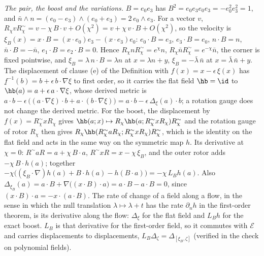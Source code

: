 \emph{The pair, the boost and the variations.} $B = e_{0}e_{3}$ has $B^{2} = e_{0}e_{3}e_{0}e_{3} = -e_{0}^{2}e_{3}^{2} = 1$, and $\bar n \wedge n = (e_{0} - e_{3}) \wedge (e_{0} + e_{3}) = 2\,e_{0} \wedge e_{3}$. For a vector $v$, $R_{\chi}vR_{\chi}^{\sim} = v - \chi\,B \cdot v + O(\chi^{2}) = v + \chi\,v \cdot B + O(\chi^{2})$, so the velocity is $\xi_{B}(x) = x \cdot B = (x \cdot e_{0})e_{3} - (x \cdot e_{3})e_{0}$: $e_{0} \cdot B = e_{3}$, $e_{3} \cdot B = e_{0}$, $n \cdot B = n$, $\bar n \cdot B = -\bar n$, $e_{1} \cdot B = e_{2} \cdot B = 0$. Hence $R_{\chi}nR_{\chi}^{\sim} = e^{\chi}n$, $R_{\chi}\bar nR_{\chi}^{\sim} = e^{-\chi}\bar n$, the corner is fixed pointwise, and $\xi_{B} = \lambda\,n \cdot B = \lambda n$ at $x = \lambda n + y$, $\xi_{B} = -\bar\lambda\,\bar n$ at $x = \bar\lambda\,\bar n + y$. The displacement of clause (e) of the Definition with $f(x) = x - \epsilon\,\xi(x)$ has $\underline{f}^{-1}(b) = b + \epsilon\,b \cdot \nabla\xi$ to first order, so it carries the flat field $\hb = \id$ to $\hb(a) = a + \epsilon\,a \cdot \nabla\xi$, whose derived metric is $a \cdot b - \epsilon\,\bigl((a \cdot \nabla\xi) \cdot b + a \cdot (b \cdot \nabla\xi)\bigr) = a \cdot b - \epsilon\,\Delta_{\xi}(a) \cdot b$; a rotation gauge does not change the derived metric. For the boost, the displacement by $f(x) = R_{\chi}^{\sim}xR_{\chi}$ gives $\hb(a; x) \mapsto R_{\chi}\hb(a; R_{\chi}^{\sim}xR_{\chi})R_{\chi}^{\sim}$ and the rotation gauge of rotor $R_{\chi}$ then gives $R_{\chi}\hb(R_{\chi}^{\sim}aR_{\chi}; R_{\chi}^{\sim}xR_{\chi})R_{\chi}^{\sim}$, which is the identity on the flat field and acts in the same way on the symmetric map $h$. Its derivative at $\chi = 0$: $R^{\sim}aR = a + \chi\,B \cdot a$, $R^{\sim}xR = x - \chi\,\xi_{B}$, and the outer rotor adds $-\chi\,B \cdot h(a)$; together $-\chi\bigl((\xi_{B} \cdot \nabla)h(a) + B \cdot h(a) - h(B \cdot a)\bigr) = -\chi\,L_{B}h(a)$. Also $\Delta_{\xi_{B}}(a) = a \cdot B + \nabla\bigl((x \cdot B) \cdot a\bigr) = a \cdot B - a \cdot B = 0$, since $(x \cdot B) \cdot a = -x \cdot (a \cdot B)$. The rate of change of a field along a flow, in the sense in which the null translation $\lambda \mapsto \lambda + t$ has the rate $\partial_{n}h$ in the first-order theorem, is its derivative along the flow: $\Delta_{\xi}$ for the flat field and $L_{B}h$ for the exact boost. $L_{B}$ is that derivative for the first-order field, so it commutes with $\mathcal{E}$ and carries displacements to displacements, $L_{B}\Delta_{\zeta} = \Delta_{[\xi_{B}, \zeta]}$ (verified in the check on polynomial fields).

